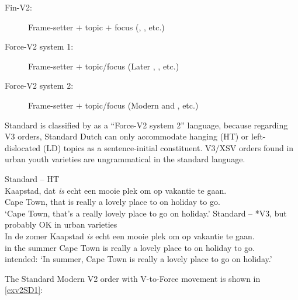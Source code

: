 \documentclass[output=paper]{langsci/langscibook}
\begin{document}
\begin{description}

    \item[Fin-V2:] Frame-setter $+$ topic $+$ focus (,
        , etc.)

    \item[Force-V2 system 1:] Frame-setter $+$ topic/focus (Later
        , , etc.)

    \item[Force-V2 system 2:] Frame-setter $+$ topic/focus
                              (Modern  and , etc.)

\end{description}

\noindent Standard  is classified by \citet{Wolfe:2017} as a
\enquote{Force-V2 system 2} language, because regarding V3 orders, Standard
Dutch can only accommodate hanging (\gls{HT}) or
left-dislocated
(\gls{LD}) topics as a sentence-initial constituent.
V3/XSV orders found in urban youth varieties are ungrammatical in the standard
language.

\ea
    \ea\label{exdisV3-ht} Standard  -- HT\\
    \gll\label{exHT-NWa}Kaapstad, dat \textit{is} echt een mooie plek om op vakantie te gaan.\\
    {Cape Town}, that is really a lovely place to on holiday to go.\Inf{}\\
    \trans \enquote*{Cape Town, that's a really lovely place to go on holiday.}
    \ex Standard  -- *V3, but probably OK in urban varieties\\
    \gll \llap{*}In de zomer Kaapstad \textit{is} echt een mooie plek om op vakantie te gaan.\\
    in the summer {Cape Town} is really a lovely place to on holiday to go.\Inf{}\\
    \trans intended: \enquote*{In summer, Cape Town is really a lovely place to go on holiday.}\label{exHT-NW2}
    \z
\z

\noindent The Standard Modern  V2 order with
V-to-Force movement is shown in \eqref{exv2SD1}:
\end{document}
